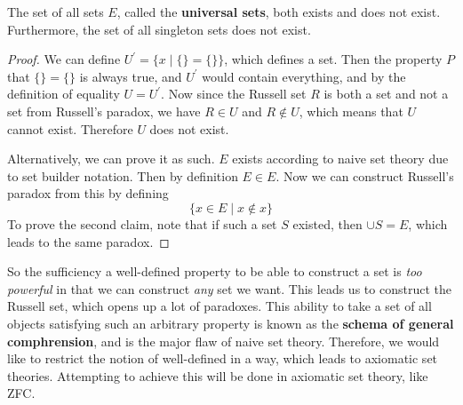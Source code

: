 \begin{corollary}
  The set of all sets $E$, called the \textbf{universal sets}, both exists and does not exist. Furthermore, the set of all singleton sets does not exist. 
\end{corollary}
\begin{proof}
  We can define $U^\prime = \{x \mid \{\} = \{\} \}$, which defines a set. Then the property $P$ that $\{\} = \{\}$ is always true, and $U^\prime$ would contain everything, and by the definition of equality $U = U^\prime$. Now since the Russell set $R$ is both a set and not a set from Russell's paradox, we have $R \in U$ and $R \not\in U$, which means that $U$ cannot exist. Therefore $U$ does not exist. 

  Alternatively, we can prove it as such. $E$ exists according to naive set theory due to set builder notation. Then by definition $E \in E$. Now we can construct Russell's paradox from this by defining 
  \begin{equation}
    \{ x \in E \mid x \not\in x \}
  \end{equation}
  To prove the second claim, note that if such a set $S$ existed, then $\cup S = E$, which leads to the same paradox. 
\end{proof}

So the sufficiency a well-defined property to be able to construct a set is \textit{too powerful} in that we can construct \textit{any} set we want. This leads us to construct the Russell set, which opens up a lot of paradoxes. This ability to take a set of all objects satisfying such an arbitrary property is known as the \textbf{schema of general comphrension}, and is the major flaw of naive set theory. Therefore, we would like to restrict the notion of well-defined in a way, which leads to axiomatic set theories. Attempting to achieve this will be done in axiomatic set theory, like ZFC. 


